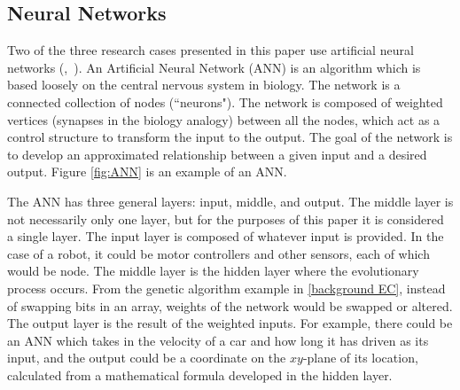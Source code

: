 \documentclass{sig-alternate}
\begin{document}
\subsection{Neural Networks}
	Two of the three research cases presented in this paper use artificial neural networks (\cite{Moore:2013:ESK:2463372.2463402},~\cite{Pretorius:2009:TAN:1632149.1632171}). An Artificial Neural Network (ANN) \cite{wiki:robotics} is an algorithm which is based loosely on the central nervous system in biology. The network is a connected collection of nodes (``neurons"). The network is composed of weighted vertices (synapses in the biology analogy) between all the nodes, which act as a control structure to transform the input to the output. The goal of the network is to develop an approximated relationship between a given input and a desired output. Figure \ref{fig:ANN} is an example of an ANN.

	 The ANN has three general layers: input, middle, and output. The middle layer is not necessarily only one layer, but for the purposes of this paper it is considered a single layer. The input layer is composed of whatever input is provided. In the case of a robot, it could be motor controllers and other sensors, each of which would be node. The middle layer is the hidden layer where the evolutionary process occurs. From the genetic algorithm example in \ref{background EC}, instead of swapping bits in an array, weights of the network would be swapped or altered. The output layer is the result of the weighted inputs. For example, there could be an ANN which takes in the velocity of a car and how long it has driven as its input, and the output could be a coordinate on the $xy$-plane of its location, calculated from a mathematical formula developed in the hidden layer.  
\end{document}

